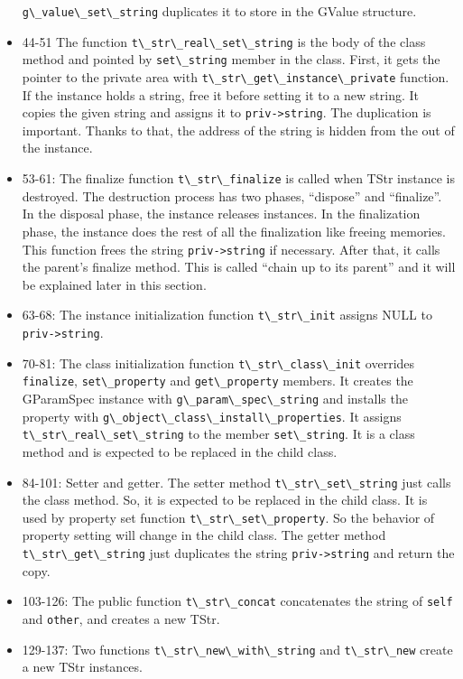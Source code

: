 \begin{itemize}
  \passthrough{\lstinline!g\_value\_set\_string!} duplicates it to store
  in the GValue structure.
\item
  44-51 The function \passthrough{\lstinline!t\_str\_real\_set\_string!}
  is the body of the class method and pointed by
  \passthrough{\lstinline!set\_string!} member in the class. First, it
  gets the pointer to the private area with
  \passthrough{\lstinline!t\_str\_get\_instance\_private!} function. If
  the instance holds a string, free it before setting it to a new
  string. It copies the given string and assigns it to
  \passthrough{\lstinline!priv->string!}. The duplication is important.
  Thanks to that, the address of the string is hidden from the out of
  the instance.
\item
  53-61: The finalize function
  \passthrough{\lstinline!t\_str\_finalize!} is called when TStr
  instance is destroyed. The destruction process has two phases,
  ``dispose'' and ``finalize''. In the disposal phase, the instance
  releases instances. In the finalization phase, the instance does the
  rest of all the finalization like freeing memories. This function
  frees the string \passthrough{\lstinline!priv->string!} if necessary.
  After that, it calls the parent's finalize method. This is called
  ``chain up to its parent'' and it will be explained later in this
  section.
\item
  63-68: The instance initialization function
  \passthrough{\lstinline!t\_str\_init!} assigns NULL to
  \passthrough{\lstinline!priv->string!}.
\item
  70-81: The class initialization function
  \passthrough{\lstinline!t\_str\_class\_init!} overrides
  \passthrough{\lstinline!finalize!},
  \passthrough{\lstinline!set\_property!} and
  \passthrough{\lstinline!get\_property!} members. It creates the
  GParamSpec instance with
  \passthrough{\lstinline!g\_param\_spec\_string!} and installs the
  property with
  \passthrough{\lstinline!g\_object\_class\_install\_properties!}. It
  assigns \passthrough{\lstinline!t\_str\_real\_set\_string!} to the
  member \passthrough{\lstinline!set\_string!}. It is a class method and
  is expected to be replaced in the child class.
\item
  84-101: Setter and getter. The setter method
  \passthrough{\lstinline!t\_str\_set\_string!} just calls the class
  method. So, it is expected to be replaced in the child class. It is
  used by property set function
  \passthrough{\lstinline!t\_str\_set\_property!}. So the behavior of
  property setting will change in the child class. The getter method
  \passthrough{\lstinline!t\_str\_get\_string!} just duplicates the
  string \passthrough{\lstinline!priv->string!} and return the copy.
\item
  103-126: The public function \passthrough{\lstinline!t\_str\_concat!}
  concatenates the string of \passthrough{\lstinline!self!} and
  \passthrough{\lstinline!other!}, and creates a new TStr.
\item
  129-137: Two functions
  \passthrough{\lstinline!t\_str\_new\_with\_string!} and
  \passthrough{\lstinline!t\_str\_new!} create a new TStr instances.
\end{itemize}


